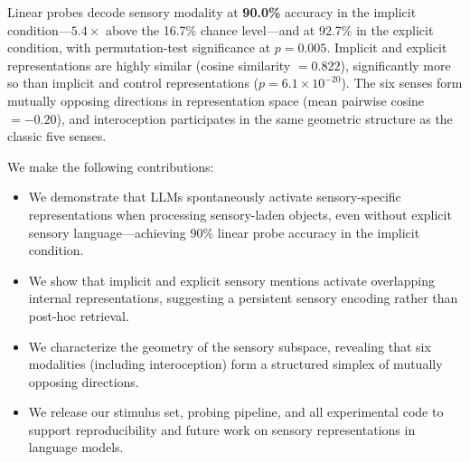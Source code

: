 Linear probes decode sensory modality at \textbf{90.0\%} accuracy in the implicit condition---$5.4\times$ above the 16.7\% chance level---and at 92.7\% in the explicit condition, with permutation-test significance at $p = 0.005$. Implicit and explicit representations are highly similar (cosine similarity $= 0.822$), significantly more so than implicit and control representations ($p = 6.1 \times 10^{-20}$). The six senses form mutually opposing directions in representation space (mean pairwise cosine $= -0.20$), and interoception participates in the same geometric structure as the classic five senses.

 We make the following contributions:
\begin{itemize}[leftmargin=*,itemsep=0pt,topsep=0pt]
    \item We demonstrate that LLMs spontaneously activate sensory-specific representations when processing sensory-laden objects, even without explicit sensory language---achieving 90\% linear probe accuracy in the implicit condition.
    \item We show that implicit and explicit sensory mentions activate overlapping internal representations, suggesting a persistent sensory encoding rather than post-hoc retrieval.
    \item We characterize the geometry of the sensory subspace, revealing that six modalities (including interoception) form a structured simplex of mutually opposing directions.
    \item We release our stimulus set, probing pipeline, and all experimental code to support reproducibility and future work on sensory representations in language models.
\end{itemize}
